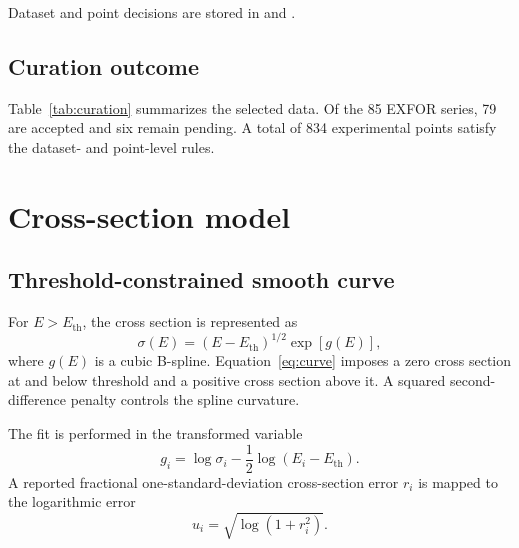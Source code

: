 \documentclass[11pt]{article}
\newcommand{\generateddir}{docs/generated/xsection_fit}
\newcommand{\generateddir}{generated/xsection_fit}
\begin{document}
\begin{table}[H]
\centering\small
\caption{Lowest production routes and laboratory thresholds.  Atomic masses
are from the \href{https://amdc.impcas.ac.cn/web/masseval.html}{AME2020 atomic-mass evaluation}.}
\label{tab:thresholds}

\end{table}

Dataset and point decisions are stored in
 and
.

\subsection{Curation outcome}

Table~\ref{tab:curation} summarizes the selected data.  Of the 85 EXFOR
series, 79 are accepted and six remain pending.  A total of 834 experimental
points satisfy the dataset- and point-level rules.

\begin{table}[H]
\centering\small
\caption{EXFOR curation by production channel.}
\label{tab:curation}

\end{table}

\section{Cross-section model}

\subsection{Threshold-constrained smooth curve}

For $E>E_{\mathrm{th}}$, the cross section is represented as
\begin{equation}
  \sigma(E)=(E-E_{\mathrm{th}})^{1/2}\exp[g(E)],
  \label{eq:curve}
\end{equation}
where $g(E)$ is a cubic B-spline.  Equation~\eqref{eq:curve} imposes a zero
cross section at and below threshold and a positive cross section above it.  A
squared second-difference penalty controls the spline curvature.

The fit is performed in the transformed variable
\begin{equation}
  g_i=\log\sigma_i-\frac{1}{2}\log(E_i-E_{\mathrm{th}}).
\end{equation}
A reported fractional one-standard-deviation cross-section error $r_i$ is
mapped to the logarithmic error
\begin{equation}
  u_i=\sqrt{\log(1+r_i^2)}.
\end{equation}
\end{document}

